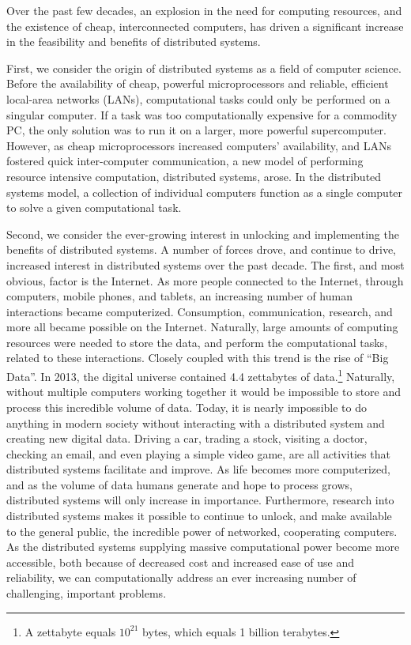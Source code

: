 Over the past few decades, an explosion in the need for computing resources,
and the existence of cheap, interconnected computers, has
driven a significant increase in the feasibility and benefits of distributed
systems.\cite[pg. 1]{distributed-systems-principles-and-paradigms}

First, we consider the origin of distributed systems as a field of computer
science. Before the availability of cheap, powerful microprocessors and reliable,
efficient local-area networks (LANs), computational tasks could only be
performed on a singular computer.\cite[pg.
1]{distributed-systems-principles-and-paradigms} If a task was too
computationally expensive for a commodity PC, the only solution was to run
it on a larger, more powerful supercomputer. However, as cheap microprocessors
increased computers' availability, and LANs fostered quick inter-computer
communication, a new
model of performing resource intensive computation, distributed
systems, arose. In the distributed systems model, a collection of individual
computers function as a single computer to solve a given computational task.\cite[pg.
2]{distributed-systems-principles-and-paradigms}

Second, we consider the ever-growing interest in unlocking and implementing the
benefits of distributed systems. A number of forces drove, and continue to drive,
increased interest in distributed systems over
the past decade. The first, and most obvious, factor is the Internet.
As more people connected to the Internet, through computers,
mobile phones, and tablets, an increasing number of human interactions became
computerized. Consumption, communication, research, and more all
became possible on the Internet. Naturally, large amounts of computing resources
were needed to store the data, and perform the computational tasks, related to these
interactions. Closely coupled with this trend is the rise of ``Big Data''.
In 2013, the digital universe contained 4.4 zettabytes of data.\footnote{A
  zettabyte equals $10^{21}$ bytes, which equals 1 billion
terabytes.}\cite{the-digital-universe-of-opportunities} Naturally, without
multiple computers working together it would be impossible to store and process
this incredible volume of data. Today, it is nearly impossible to do
anything in modern society without interacting with a distributed system and
creating new digital data. Driving a car, trading a stock, visiting a doctor,
checking an email, and even playing a simple video game, are all activities that
distributed systems facilitate and improve.\cite[pg.
4]{distributed-systems-concepts-and-design} As life becomes more
computerized, and as the volume of data humans generate and hope to process
grows, distributed systems will only increase in importance.
Furthermore, research into distributed systems makes it possible to
continue to unlock, and make available to the general public,
the incredible power of networked, cooperating computers. As the distributed systems
supplying massive computational power become more
accessible, both because of decreased cost and increased ease of use and
reliability, we can
computationally address an ever increasing number of challenging, important problems.

